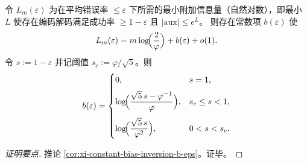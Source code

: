 \begin{conclusion}\label{con:xi-min-sideinfo-avg-error-constant-b-eps}
令 \(L_m(\varepsilon)\) 为在平均错误率 \(\le\varepsilon\) 下所需的最小附加信息量（自然对数），即最小 \(L\) 使存在编码解码满足成功率 \(\ge 1-\varepsilon\) 且 \(|\mathrm{aux}|\le e^{L}\)。
则存在常数项 \(b(\varepsilon)\) 使
\[
L_m(\varepsilon)=m\log\!\Bigl(\frac{2}{\varphi}\Bigr)+b(\varepsilon)+o(1).
\]
令 \(s:=1-\varepsilon\) 并记阈值 \(s_c:=\varphi/\sqrt5\)。则
\[
b(\varepsilon)=
\begin{cases}
0, & s=1,\\[6pt]
\displaystyle \log\!\Bigl(\frac{\sqrt5\,s-\varphi^{-1}}{\varphi}\Bigr), & s_c\le s<1,\\[12pt]
\displaystyle \log\!\Bigl(\frac{\sqrt5\,s}{\varphi^2}\Bigr), & 0<s<s_c.
\end{cases}
\]
\end{conclusion}
\begin{proof}[证明要点]
推论 \ref{cor:xi-constant-bias-inversion-b-eps}。证毕。
\end{proof}

